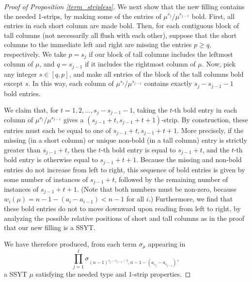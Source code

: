 \documentclass[11pt]{article}
\theoremstyle{definition}
\numberwithin{equation}{section}
\begin{document}
\begin{proof}[Proof of Proposition \ref{term_stripless}]
We next show that the new filling contains the needed 1-strips, by making some of the entries of $\mu^{s_j}/\mu^{s_{j-1}}$ bold. First, all entries in each short column are made bold. Then, for each contiguous block of tall columns (not necessarily all flush with each other), suppose that the short columns to the immediate left and right are missing the entries $p\ge q$, respectively. We take $p=s_j$ if our block of tall columns includes the leftmost column of $\mu$, and $q=s_{j-1}$ if it includes the rightmost column of $\mu$. Now, pick any integer $s\in[q,p]$, and make all entries of the block of the tall columns bold except $s$. In this way, each column of $\mu^{s_j}/\mu^{s_{j-1}}$ contains exactly $s_j-s_{j-1}-1$ bold entries.

We claim that, for $t=1,2,\ldots,s_j-s_{j-1}-1$, taking the $t$-th bold entry in each column of $\mu^{s_j}/\mu^{s_{j-1}}$ gives a $(s_{j-1}+t,s_{j-1}+t+1)$-strip. By construction, these entries must each be equal to one of $s_{j-1}+t,s_{j-1}+t+1$. More precisely, if the missing (in a short column) or unique non-bold (in a tall column) entry is strictly greater than $s_{j-1}+t$, then the $t$-th bold entry is equal to $s_{j-1}+t$, and the $t$-th bold entry is otherwise equal to $s_{j-1}+t+1$. Because the missing and non-bold entries do not increase from left to right, this sequence of bold entries is given by some number of instances of $s_{j-1}+t$, followed by the remaining number of instances of $s_{j-1}+t+1$. (Note that both numbers must be non-zero, because $w_i(\mu)=n-1-(a_i-a_{i-1})<n-1$ for all $i$.) Furthermore, we find that these bold entries do not to move downward upon reading from left to right, by analyzing the possible relative positions of short and tall columns as in the proof that our new filling is a SSYT.

We have therefore produced, from each term $\sigma_\mu$ appearing in
\begin{equation*}
 \prod_{j=1}^{\ell}\sigma_{(n-1)^{s_j-s_{j-1}-1},n-1-(a_{s_j}-a_{s_{j-1}})},
 \end{equation*}
 a SSYT $\mu$ satisfying the needed type and 1-strip properties. 
 

\end{proof}
\end{document}
